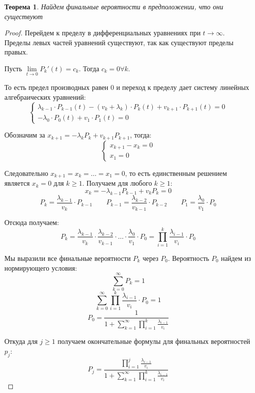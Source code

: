 \documentclass[aps,%
12pt,%
final,%
oneside,
onecolumn,%
musixtex, %
superscriptaddress,%
centertags]{article} %
\theoremstyle{plain}
\newtheorem{theorem}{Теорема}[section] %
\theoremstyle{definition}
\theoremstyle{remark}
\begin{document}
\begin{theorem}
	Найдем финальные вероятности в предположении, что они существуют
\end{theorem}
\begin{proof}
	Перейдем к пределу в дифференциальных уравнениях при $t \to \infty$. Пределы левых частей уравнений существуют, так как существуют пределы правых.

	Пусть $\lim\limits_{t \to 0} P_k'(t) = c_k$. Тогда $c_k = 0 \forall k$. 

	То есть предел производных равен $0$ и переход к пределу дает систему линейных алгебраических уравнений:
	$$\begin{cases}
		\lambda_{k-1} \cdot P_{k-1}(t) -(v_k + \lambda_k) \cdot P_k(t) + v_{k+1} \cdot P_{k+1}(t) = 0\\
		-\lambda_0 \cdot P_0(t) + v_1 \cdot P_1(t) = 0
	\end{cases}$$

	Обозначим за $x_{k+1} = -\lambda_k P_k + v_{k+1}P_{k+1}$, тогда:
	$$\begin{cases}
		x_{k+1} - x_k = 0 \\
		x_1 = 0
	\end{cases}$$

	Следовательно $x_{k+1} = x_k = \ldots = x_{1} = 0$, то есть единственным решением является $x_k = 0$ для $k \geq 1$. Получаем для любого $k \geq 1$:
	$$x_{k} = -\lambda_{k-1} P_{k-1} + v_{k}P_{k}  = 0$$
	$$P_k =\frac{\lambda_{k-1}}{v_k} \cdot P_{k-1} \qquad P_{k-1} =\frac{\lambda_{k-2}}{v_{k-1}} \cdot P_{k-2} \qquad P_1 = \frac{\lambda_0}{v_1} \cdot P_0$$

	Отсюда получаем:
	$$P_k = \frac{\lambda_{k-1}}{v_k} \cdot \frac{\lambda_{k-2}}{v_{k-1}} \cdot \ldots \cdot \frac{\lambda_0}{v_1} \cdot P_0 = \prod_{i=1}^k \frac{\lambda_{i-1}}{v_i} \cdot P_0$$

	Мы выразили все финальные вероятности $P_k$ через $P_0$. Вероятность $P_0$ найдем из нормирующего условия:
	$$\sum\limits_{k=0}^{\infty} P_k = 1$$
	$$\sum\limits_{k=0}^{\infty} \prod_{i=1}^k \frac{\lambda_{i-1}}{v_i} \cdot P_0 = 1$$
	$$P_0 = \frac{1}{1+ \sum\limits_{k=1}^{\infty} \prod\limits_{i=1}^k \frac{\lambda_{i-1}}{v_i}}$$

	Откуда для $j \geq 1$ получаем окончательные формулы для финальных вероятностей $p_j$:
	$$P_j = \frac{ \prod\limits_{i=1}^j \frac{\lambda_{i-1}}{v_i}}{1+ \sum\limits_{k=1}^{\infty} \prod\limits_{i=1}^k \frac{\lambda_{i-1}}{v_i}}$$
\end{proof}
\end{document}
